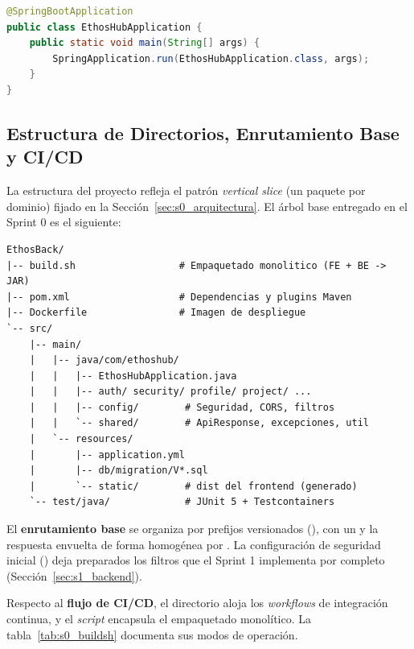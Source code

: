 \begin{lstlisting}[language=Java, caption={Punto de entrada del backend (Sprint 0).}, label={lst:s0_main}]
@SpringBootApplication
public class EthosHubApplication {
    public static void main(String[] args) {
        SpringApplication.run(EthosHubApplication.class, args);
    }
}
\end{lstlisting}

\subsection{Estructura de Directorios, Enrutamiento Base y CI/CD}
\label{ssec:s0_be_estructura}

La estructura del proyecto refleja el patrón \textit{vertical slice} (un paquete por dominio)
fijado en la Sección~\ref{sec:s0_arquitectura}. El árbol base entregado en el Sprint 0 es el
siguiente:

\begin{lstlisting}[caption={Estructura de directorios del backend.}, label={lst:s0_tree}]
EthosBack/
|-- build.sh                  # Empaquetado monolitico (FE + BE -> JAR)
|-- pom.xml                   # Dependencias y plugins Maven
|-- Dockerfile                # Imagen de despliegue
`-- src/
    |-- main/
    |   |-- java/com/ethoshub/
    |   |   |-- EthosHubApplication.java
    |   |   |-- auth/ security/ profile/ project/ ...
    |   |   |-- config/        # Seguridad, CORS, filtros
    |   |   `-- shared/        # ApiResponse, excepciones, util
    |   `-- resources/
    |       |-- application.yml
    |       |-- db/migration/V*.sql
    |       `-- static/        # dist del frontend (generado)
    `-- test/java/             # JUnit 5 + Testcontainers
\end{lstlisting}

El \textbf{enrutamiento base} se organiza por prefijos versionados (),
con un  y la respuesta envuelta de forma homogénea por
. La configuración de seguridad inicial () deja
preparados los filtros que el Sprint 1 implementa por completo
(Sección~\ref{sec:s1_backend}).

Respecto al \textbf{flujo de CI/CD}, el directorio  aloja los \textit{workflows}
de integración continua, y el \textit{script}  encapsula el empaquetado
monolítico. La tabla~\ref{tab:s0_buildsh} documenta sus modos de operación.

